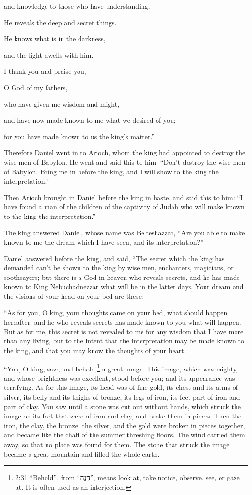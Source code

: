 and knowledge to those who have understanding.


\myverse{}He reveals the deep and secret things.

He knows what is in the darkness,

and the light dwells with him.


\myverse{}I thank you and praise you,

O God of my fathers,

who have given me wisdom and might,

and have now made known to me what we desired of you;

for you have made known to us the king’s matter.”


\myverse{}Therefore Daniel went in to Arioch, whom the king had appointed to destroy the wise men of Babylon. He went and said this to him: “Don’t destroy the wise men of Babylon. Bring me in before the king, and I will show to the king the interpretation.”


\myverse{}Then Arioch brought in Daniel before the king in haste, and said this to him: “I have found a man of the children of the captivity of Judah who will make known to the king the interpretation.”


\myverse{}The king answered Daniel, whose name was Belteshazzar, “Are you able to make known to me the dream which I have seen, and its interpretation?”


\myverse{}Daniel answered before the king, and said, “The secret which the king has demanded can’t be shown to the king by wise men, enchanters, magicians, or soothsayers; \myverse{}but there is a God in heaven who reveals secrets, and he has made known to King Nebuchadnezzar what will be in the latter days. Your dream and the visions of your head on your bed are these:


\myverse{}“As for you, O king, your thoughts came on your bed, what should happen hereafter; and he who reveals secrets has made known to you what will happen. \myverse{}But as for me, this secret is not revealed to me for any wisdom that I have more than any living, but to the intent that the interpretation may be made known to the king, and that you may know the thoughts of your heart.


\myverse{}“You, O king, saw, and behold,\footnote{2:31 “Behold”, from “הִנֵּה”, means look at, take notice, observe, see, or gaze at. It is often used as an interjection.} a great image. This image, which was mighty, and whose brightness was excellent, stood before you; and its appearance was terrifying. \myverse{}As for this image, its head was of fine gold, its chest and its arms of silver, its belly and its thighs of bronze, \myverse{}its legs of iron, its feet part of iron and part of clay. \myverse{}You saw until a stone was cut out without hands, which struck the image on its feet that were of iron and clay, and broke them in pieces. \myverse{}Then the iron, the clay, the bronze, the silver, and the gold were broken in pieces together, and became like the chaff of the summer threshing floors. The wind carried them away, so that no place was found for them. The stone that struck the image became a great mountain and filled the whole earth.



